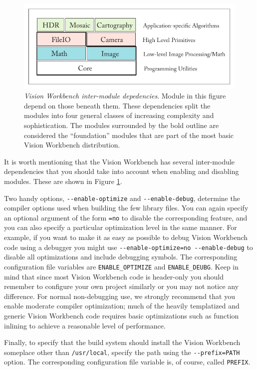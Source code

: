 \begin{figure}[bt]
\begin{center}
  \includegraphics[width=6in]{images/module_dependencies.pdf}
 \end{center}
  \label{fig:module-dependencies}
  \caption{{\em Vision Workbench inter-module depedencies}.  Module in this
    figure depend on those beneath them.  These dependencies split the
    modules into four general classes of increasing complexity and
    sophistication.  The modules surrounded by the bold outline are
    considered the ``foundation'' modules that are part of the most
    basic Vision Workbench distribution.}
\end{figure}

It is worth mentioning that the Vision Workbench has several
inter-module dependencies that you should take into account when
enabling and disabling modules.  These are shown in Figure
\ref{fig:module-dependencies}.

Two handy options, \verb#--enable-optimize# and \verb#--enable-debug#,
determine the compiler options used when building the few library
files.  You can again specify an optional argument of the form
\verb#=no# to disable the corresponding feature, and you can also
specify a particular optimization level in the same manner.  For
example, if you want to make it as easy as possible to debug Vision
Workbench code using a debugger you might use
\verb#--enable-optimize=no --enable-debug# to disable all
optimizations and include debugging symbols.  The corresponding
configuration file variables are \verb#ENABLE_OPTIMIZE# and
\verb#ENABLE_DEUBG#.  Keep in mind that since most Vision Workbench
code is header-only you should remember to configure your own project
similarly or you may not notice any difference.  For normal
non-debugging use, we strongly recommend that you enable moderate
compiler optimization; much of the heavily templatized and generic
Vision Workbench code requires basic optimizations such as function
inlining to achieve a reasonable level of performance.

Finally, to specify that the build system should install the Vision Workbench 
someplace other than \verb#/usr/local#, specify the path using the 
\verb#--prefix=PATH# option.   The corresponding configuration file 
variable is, of course, called \verb#PREFIX#.
